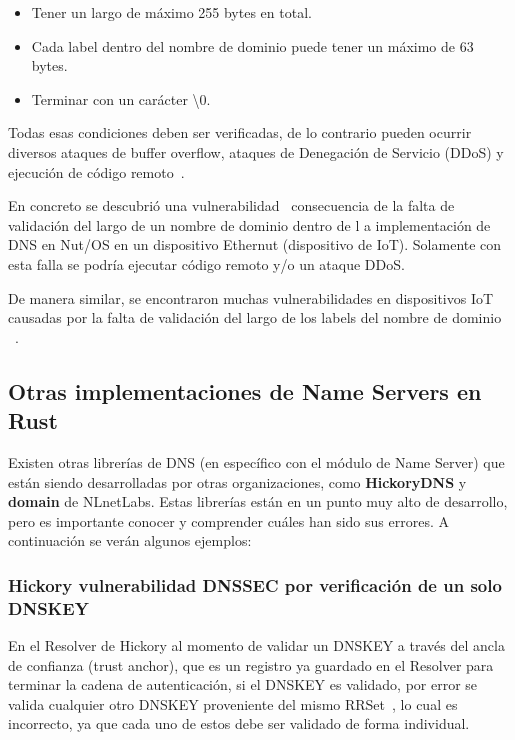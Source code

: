 \begin{itemize}
\item Tener un largo de máximo 255 bytes en total.
\item Cada label dentro del nombre de dominio puede tener un máximo de 63 bytes.
\item Terminar con un carácter \textbackslash 0.
\end{itemize}

Todas esas condiciones deben ser verificadas, de lo contrario pueden ocurrir diversos ataques de buffer overflow, ataques de Denegación de 
Servicio (DDoS) y ejecución de código remoto~\cite{AtaquesRFC}.

En concreto se descubrió una vulnerabilidad~\cite{Ethernut} consecuencia de la falta de validación del largo de un nombre de dominio dentro de l
a implementación de DNS en Nut/OS en un dispositivo Ethernut (dispositivo de IoT). Solamente con esta falla se podría ejecutar código remoto y/o 
un ataque DDoS.

De manera similar, se encontraron muchas vulnerabilidades en dispositivos IoT causadas por la falta de validación del largo de los labels del 
nombre de dominio ~\cite{LabelsIOT}.

\subsection{Otras implementaciones de Name Servers en Rust}

Existen otras librerías de DNS (en específico con el módulo de Name Server) que están siendo desarrolladas por otras organizaciones, como 
\textbf{HickoryDNS} \cite{HickoryDNS} y \textbf{domain}\cite{NLnetLabs} de NLnetLabs. Estas librerías están en un punto muy alto de desarrollo, pero es 
importante conocer y comprender cuáles han sido sus errores. A continuación se verán algunos ejemplos:

\subsubsection{Hickory vulnerabilidad DNSSEC por verificación de un solo DNSKEY}

En el Resolver de Hickory al momento de validar un DNSKEY a través del ancla de confianza (trust anchor), que es un registro ya guardado en el 
Resolver para terminar la cadena de autenticación, si el DNSKEY es validado, por error se valida cualquier otro DNSKEY proveniente del mismo 
RRSet~\cite{HickoryBug}, lo cual es incorrecto, ya que cada uno de estos debe ser validado de forma individual.



